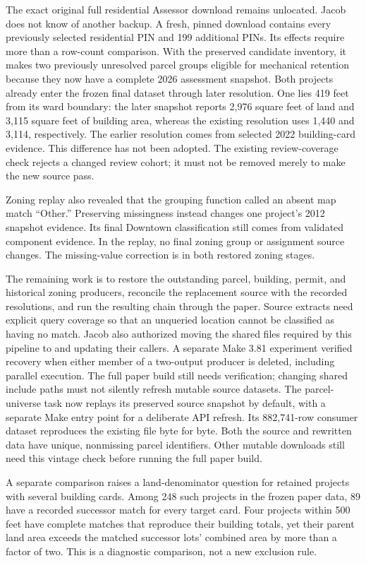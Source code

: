 The exact original full residential Assessor download remains unlocated.
Jacob does not know of another backup. A fresh, pinned download contains every
previously selected residential PIN and 199 additional PINs. Its effects require
more than a row-count comparison. With the preserved candidate inventory, it
makes two previously unresolved parcel groups eligible for mechanical retention
because they now have a complete 2026 assessment snapshot. Both projects already
enter the frozen final dataset through later resolution. One lies 419 feet from
its ward boundary: the later snapshot reports 2,976 square feet of land and
3,115 square feet of building area, whereas the existing resolution uses 1,440
and 3,114, respectively. The earlier resolution comes from selected 2022
building-card evidence. This difference has not been adopted. The existing
review-coverage check rejects a changed review cohort; it must not be removed
merely to make the new source pass.

Zoning replay also revealed that the grouping function called an absent map
match ``Other.'' Preserving missingness instead changes one project's 2012
snapshot evidence. Its final Downtown classification still comes from validated
component evidence. In the replay, no final zoning group or assignment source
changes. The missing-value correction is in both restored zoning stages.

The remaining work is to restore the outstanding parcel, building, permit,
and historical zoning producers, reconcile the replacement source with the
recorded resolutions, and run the resulting chain through the paper. Source
extracts need explicit query coverage so that an unqueried location cannot
be classified as having no match. Jacob also authorized moving the shared
files required by this pipeline to  and updating their
callers. A separate Make 3.81 experiment verified recovery when either member
of a two-output producer is deleted, including parallel execution. The full
paper build still needs verification; changing shared include paths must not
silently refresh mutable source datasets. The parcel-universe task now replays
its preserved source snapshot by default, with a separate Make entry point for
a deliberate API refresh. Its 882,741-row consumer dataset reproduces the
existing file byte for byte. Both the source and rewritten data have unique,
nonmissing parcel identifiers. Other mutable downloads still need this vintage
check before running the full paper build.

A separate comparison raises a land-denominator question for retained projects
with several building cards. Among 248 such projects in the frozen paper data,
89 have a recorded successor match for every target card. Four projects within
500 feet have complete matches that reproduce their building totals, yet their
parent land area exceeds the matched successor lots' combined area by more than
a factor of two. This is a diagnostic comparison, not a new exclusion rule.

